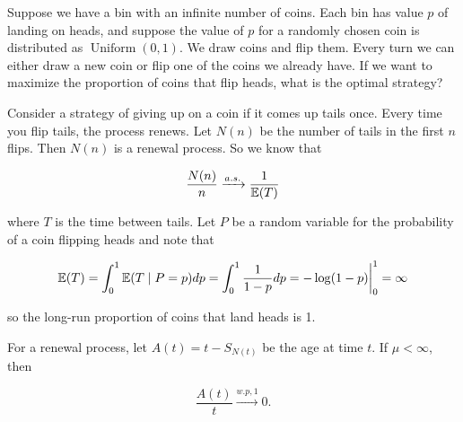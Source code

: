 \begin{example} Suppose we have a bin with an infinite number of coins. Each bin has value \(p\) of landing on heads, and suppose the value of \(p\) for a randomly chosen coin is distributed as \(\operatorname{Uniform}(0,1)\). We draw coins and flip them. Every turn we can either draw a new coin or flip one of the coins we already have. If we want to maximize the proportion of coins that flip heads, what is the optimal strategy?

\begin{solution} Consider a strategy of giving up on a coin if it comes up tails once. Every time you flip tails, the process renews. Let \(N(n)\) be the number of tails in the first \(n\) flips. Then \(N(n)\) is a renewal process. So we know that

\[
\frac{N(n)}{n} \xrightarrow{a.s.} \frac{1}{\E(T)}
\]

where \(T\) is the time between tails. Let \(P\) be a random variable for the probability of a coin flipping heads and note that

\[
\E(T) = \int_0^1 \E(T \mid P=p) dp = \int_0^1 \frac{1}{1-p} dp = - \log(1-p) \bigg|_0^1 = \infty
\]

so the long-run proportion of coins that land heads is 1.

\end{solution}

\end{example}

\begin{proposition} For a renewal process, let \(A(t) = t - S_{N(t)}\) be the age at time \(t\). If \(\mu < \infty\), then 

\[
\frac{A(t)}{t} \xrightarrow{w.p,1} 0 .
\]

\end{proposition}


